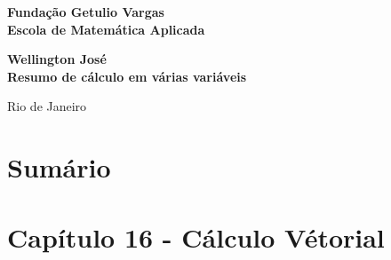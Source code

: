 \documentclass[12pt]{article}
\begin{document}
\begin{titlepage}
\begin{center}
\textbf{\LARGE Fundação Getulio Vargas}\\ 
\textbf{\LARGE Escola de Matemática Aplicada}

\par
\vspace{170pt}
\textbf{\Large Wellington José}\\
\vspace{32pt}
\textbf{\Large Resumo de cálculo em várias variáveis}\\
\end{center}

\par
\vfill
\begin{center}
{{\normalsize Rio de Janeiro}\\
{\normalsize \the\year}}
\end{center}
\end{titlepage}

\section*{Sumário}

\textbf{}
\vspace{4mm}

\textbf{}
\vspace{4mm}

\textbf{}
\vspace{4mm}

\textbf{}
\vspace{4mm}

\textbf{}
\vspace{4mm}

\textbf{}
\vspace{4mm}

\textbf{}
\vspace{4mm}

\textbf{}
\vspace{4mm}

\textbf{}
\vspace{4mm}

\textbf{}
\vspace{4mm}

\textbf{}

\newpage

\section*{Capítulo 16 - Cálculo Vétorial}
\label{s1}
\end{document}
